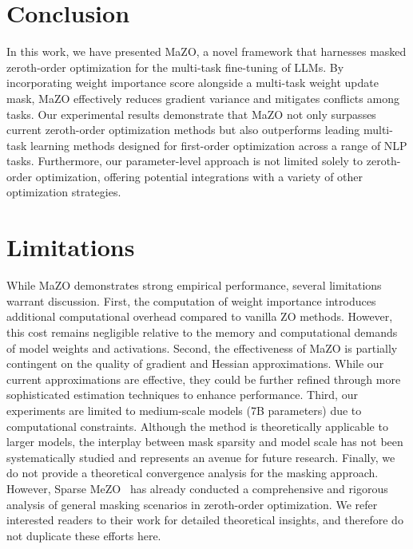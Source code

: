 \vspace{-1pt}
\section{Conclusion}
\vspace{-1pt}
In this work, we have presented MaZO, a novel framework that harnesses masked zeroth-order optimization for the multi-task fine-tuning of LLMs. By incorporating weight importance score alongside a multi-task weight update mask, MaZO effectively reduces gradient variance and mitigates conflicts among tasks. Our experimental results demonstrate that MaZO not only surpasses current zeroth-order optimization methods but also outperforms leading multi-task learning methods designed for first-order optimization across a range of NLP tasks. Furthermore, our parameter-level approach is not limited solely to zeroth-order optimization, offering potential integrations with a variety of other optimization strategies.

\section{Limitations}
While MaZO demonstrates strong empirical performance, several limitations warrant discussion. First, the computation of weight importance introduces additional computational overhead compared to vanilla ZO methods. However, this cost remains negligible relative to the memory and computational demands of model weights and activations. Second, the effectiveness of MaZO is partially contingent on the quality of gradient and Hessian approximations. While our current approximations are effective, they could be further refined through more sophisticated estimation techniques to enhance performance. Third, our experiments are limited to medium-scale models (7B parameters) due to computational constraints. Although the method is theoretically applicable to larger models, the interplay between mask sparsity and model scale has not been systematically studied and represents an avenue for future research. Finally, we do not provide a theoretical convergence analysis for the masking approach. However, Sparse MeZO~\citep{liu2024sparse} has already conducted a comprehensive and rigorous analysis of general masking scenarios in zeroth-order optimization. We refer interested readers to their work for detailed theoretical insights, and therefore do not duplicate these efforts here.